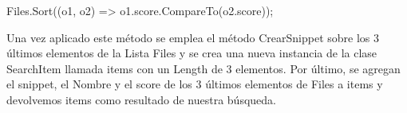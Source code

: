 \documentclass[
]{article}
\begin{document}
Files.Sort((o1, o2) =\textgreater{} o1.score.CompareTo(o2.score));

Una vez aplicado este método se emplea el método CrearSnippet sobre los
3 últimos elementos de la Lista Files y se crea una nueva instancia de
la clase SearchItem llamada items con un Length de 3 elementos. Por
último, se agregan el snippet, el Nombre y el score de los 3 últimos
elementos de Files a items y devolvemos items como resultado de nuestra
búsqueda.
\end{document}
